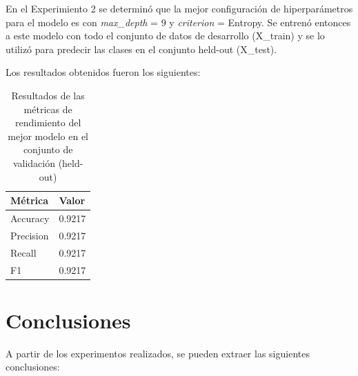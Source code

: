 \documentclass[11pt,a4paper, twocolumn]{article}
\begin{document}
\begin{itemize}
En el Experimiento 2 se determinó que la mejor configuración de hiperparámetros para el modelo es con \textit{max\_depth} = 9 y \textit{criterion} = Entropy. 
Se entrenó entonces a este modelo con todo el conjunto de datos de desarrollo (X\_train) y se lo utilizó para predecir las clases en el conjunto held-out (X\_test). 

Los resultados obtenidos fueron los siguientes:

\begin{table}[H]
    \centering
    \begin{tabular}{ll}
        \hline
        Métrica    & Valor  \\
        \hline
        Accuracy  & 0.9217 \\
        Precision & 0.9217 \\
        Recall    & 0.9217 \\
        F1        & 0.9217 \\
        \hline
    \end{tabular}
    \caption{Resultados de las métricas de rendimiento del mejor modelo en el conjunto de validación (held-out)}
    \label{tab:resultados}
\end{table}

\end{itemize}

\section{Conclusiones}

A partir de los experimentos realizados, se pueden extraer las siguientes conclusiones:
\end{document}
